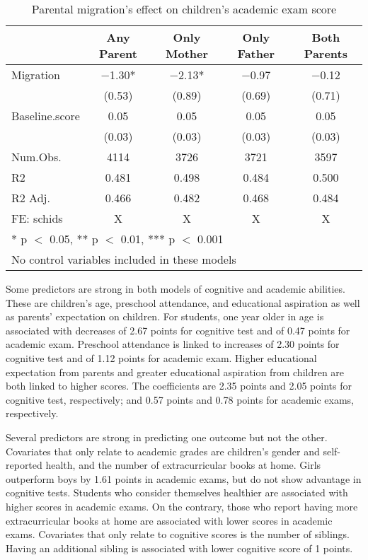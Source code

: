 \documentclass[
  man,floatsintext]{apa7}
\begin{document}
\begin{table}

\caption{Parental migration’s effect on children’s academic exam score}
\centering
\begin{tabular}[t]{lcccc}
\toprule
  & Any Parent & Only Mother & Only Father & Both Parents\\
\midrule
Migration & \num{-1.30}* & \num{-2.13}* & \num{-0.97} & \num{-0.12}\\
 & (\num{0.53}) & (\num{0.89}) & (\num{0.69}) & (\num{0.71})\\
Baseline.score & \num{0.05} & \num{0.05} & \num{0.05} & \num{0.05}\\
 & (\num{0.03}) & (\num{0.03}) & (\num{0.03}) & (\num{0.03})\\
\midrule
Num.Obs. & \num{4114} & \num{3726} & \num{3721} & \num{3597}\\
R2 & \num{0.481} & \num{0.498} & \num{0.484} & \num{0.500}\\
R2 Adj. & \num{0.466} & \num{0.482} & \num{0.468} & \num{0.484}\\
FE: schids & X & X & X & X\\
\bottomrule
\multicolumn{5}{l}{\rule{0pt}{1em}* p $<$ 0.05, ** p $<$ 0.01, *** p $<$ 0.001}\\
\multicolumn{5}{l}{\rule{0pt}{1em}No control variables included in these models}\\
\end{tabular}
\end{table}

Some predictors are strong in both models of cognitive and academic abilities. These are children's age, preschool attendance, and educational aspiration as well as parents' expectation on children. For students, one year older in age is associated with decreases of 2.67 points for cognitive test and of 0.47 points for academic exam. Preschool attendance is linked to increases of 2.30 points for cognitive test and of 1.12 points for academic exam. Higher educational expectation from parents and greater educational aspiration from children are both linked to higher scores. The coefficients are 2.35 points and 2.05 points for cognitive test, respectively; and 0.57 points and 0.78 points for academic exams, respectively.

Several predictors are strong in predicting one outcome but not the other. Covariates that only relate to academic grades are children's gender and self-reported health, and the number of extracurricular books at home. Girls outperform boys by 1.61 points in academic exams, but do not show advantage in cognitive tests. Students who consider themselves healthier are associated with higher scores in academic exams. On the contrary, those who report having more extracurricular books at home are associated with lower scores in academic exams. Covariates that only relate to cognitive scores is the number of siblings. Having an additional sibling is associated with lower cognitive score of 1 points.
\end{document}
